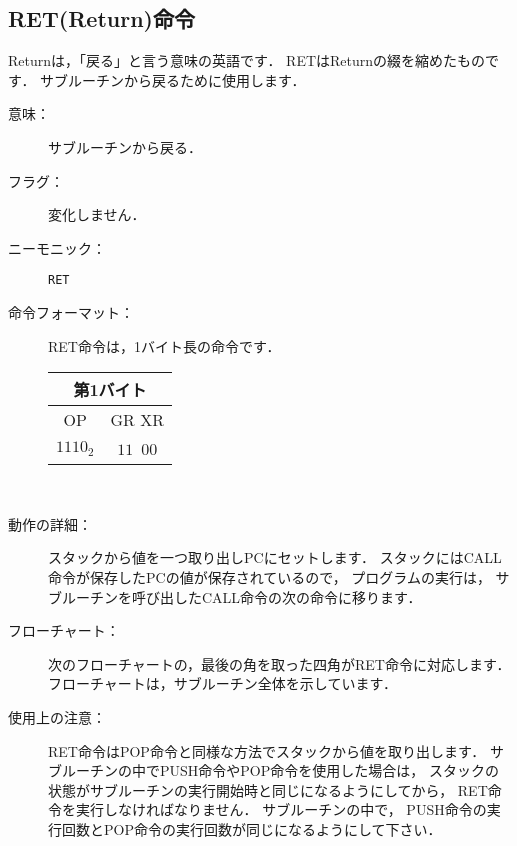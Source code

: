 \newpage
\subsection{RET(Return)命令}

Returnは，「戻る」と言う意味の英語です．
RETはReturnの綴を縮めたものです．
サブルーチンから戻るために使用します．

\begin{description}
\item[意味：] サブルーチンから戻る．

\item[フラグ：] 変化しません．

\item[ニーモニック：] {\tt RET}

\item[命令フォーマット：] RET命令は，1バイト長の命令です．

\begin{tabular}{|c|c|} \hline
\multicolumn{2}{|c|}{第1バイト} \\
\hline
OP & GR XR \\
\hline
$1110_2$ & $11$~$00$ \\
\hline
\end{tabular}\\

\item[動作の詳細：]
スタックから値を一つ取り出しPCにセットします．
スタックにはCALL命令が保存したPCの値が保存されているので，
プログラムの実行は，
サブルーチンを呼び出したCALL命令の次の命令に移ります．

\item[フローチャート：]
次のフローチャートの，最後の角を取った四角がRET命令に対応します．
フローチャートは，サブルーチン全体を示しています．

\begin{flushleft}
\epsfxsize=3cm
\end{flushleft}

\item[使用上の注意：]
RET命令はPOP命令と同様な方法でスタックから値を取り出します．
サブルーチンの中でPUSH命令やPOP命令を使用した場合は，
スタックの状態がサブルーチンの実行開始時と同じになるようにしてから，
RET命令を実行しなければなりません．
サブルーチンの中で，
PUSH命令の実行回数とPOP命令の実行回数が同じになるようにして下さい．

\end{description}

